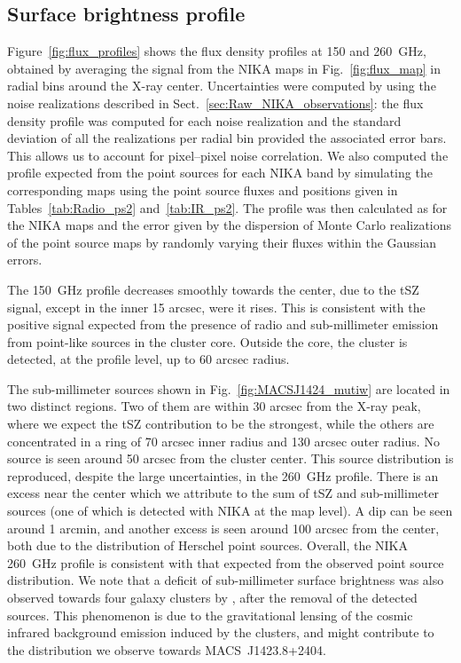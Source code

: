 \documentclass[twocolumn,traditabstract]{aa}
\begin{document}
\subsection{Surface brightness profile}\label{sec:surface_brightness_profiles_comparison}
Figure~\ref{fig:flux_profiles}  shows the flux density profiles at 150 and 260~GHz, obtained by averaging the signal from the NIKA maps in Fig.~\ref{fig:flux_map} in radial bins around the X-ray center. Uncertainties were computed by using the noise realizations described in Sect.~\ref{sec:Raw_NIKA_observations}: the flux density profile was computed for each noise realization and the standard deviation of all the realizations per radial bin provided the associated error bars. This allows us to account for pixel--pixel noise correlation. We also computed the profile expected from the point sources for each NIKA band by simulating the corresponding maps using the point source fluxes and positions given in Tables~\ref{tab:Radio_ps2} and~\ref{tab:IR_ps2}. The profile was then calculated as for the NIKA maps and the error given by the dispersion of Monte Carlo realizations of the point source maps by randomly varying their fluxes within the Gaussian errors.

The 150~GHz profile decreases smoothly towards the center, due to the tSZ signal, except in the inner 15 arcsec, were it rises. This is consistent with the positive signal expected from the presence of radio and sub-millimeter emission from point-like sources in the cluster core. Outside the core, the cluster is detected, at the profile level, up to 60 arcsec radius. 

The sub-millimeter sources shown in Fig.~\ref{fig:MACSJ1424_mutiw} are located in two distinct regions. Two of them are within 30 arcsec from the X-ray peak, where we expect the tSZ contribution to be the strongest, while the others are concentrated in a ring of 70 arcsec inner radius and 130 arcsec outer radius. No source is seen around 50 arcsec from the cluster center. This source distribution is reproduced, despite the large uncertainties, in the 260~GHz profile. There is an excess near the center which we attribute to the sum of tSZ and sub-millimeter sources (one of  which is detected with NIKA at the map level). A dip can be  seen around 1 arcmin, and another excess is seen around 100 arcsec from the center, both due to the distribution of Herschel point sources. Overall, the NIKA 260~GHz profile is consistent with that expected from the observed point source distribution. We note that a deficit of sub-millimeter surface brightness was also observed towards four galaxy clusters by \cite{zemcov2013}, after the removal of the detected sources. This phenomenon is due to the gravitational lensing of the cosmic infrared background emission induced by the clusters, and might contribute to the distribution we observe towards \mbox{MACS~J1423.8+2404}.
\end{document}
